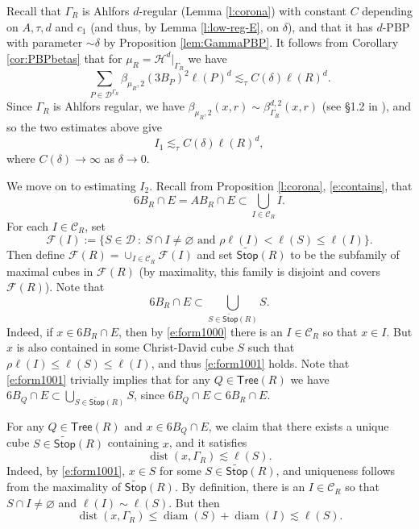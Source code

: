 \documentclass[11pt,reqno]{amsart}
\newcommand{\Stop}{\mathsf{Stop}}
\def\cC{{\mathscr{C}}}
\def\cF{{\mathscr{F}}}
\newcommand{\Tree}{\mathsf{Tree}}
\DeclareMathOperator{\diam}{diam}
\def\dist{\mathop\mathrm{dist}} 						%
\theoremstyle{definition}
\theoremstyle{remark}
\numberwithin{equation}{section}
\newcommand{\wt}{\widetilde}
\newcommand{\dD}{\mathcal{D}}
\theoremstyle{theorem}
\theoremstyle{definition}
\theoremstyle{remark}
\numberwithin{equation}{section}
\begin{document}
	Recall that $\Gamma_R$ is Ahlfors $d$-regular (Lemma \ref{l:corona}) with constant $C$ depending on $A, \tau, d$ and $c_1$ (and thus, by Lemma \ref{l:low-reg-E}, on $\delta$), and that it has $d$-PBP  with parameter $\sim\delta$ by Proposition \ref{lem:GammaPBP}. It follows from Corollary \ref{cor:PBPbetas} that for $\mu_R=\mathcal{H}^d|_{\Gamma_R}$ we have	
	\begin{equation*}
	\sum_{P \in \dD^{\Gamma_R}} \beta_{\mu_R,2}(3 B_P)^2 \ell(P)^d\lesssim_\tau C(\delta)\ell(R)^d.
	\end{equation*}
	Since $\Gamma_R$ is Ahlfors regular, we have $\beta_{\mu_R,2}(x,r)\sim \beta_{\Gamma_R}^{d,2}(x,r)$ (see \S 1.2 in \cite{azzam2018analyst}), and so the two estimates above give
	\begin{equation}
	I_1 \lesssim_\tau C(\delta) \ell(R)^d,
	\end{equation}
	where $C(\delta) \to \infty$ as $\delta\to 0$. 
	\newcommand{\wstop}{\wt{\Stop}}
	
	We move on to estimating $I_2$. Recall from Proposition \ref{l:corona}, \eqref{e:contains}, that
	\begin{equation}\label{e:form1000}
		 6 B_R \cap E = A B_R \cap E \subset \bigcup_{I\in\cC_R} I.
	\end{equation} 
	For each $I \in \cC_R$, set 
	\begin{equation}\label{e:form1002}
		\cF(I):= \{S \in \dD \ :\ S \cap I\neq \varnothing \mbox{ and } \rho \ell(I) < \ell(S) \leq \ell(I)\}.
	\end{equation}
	Then define $\cF(R)= \cup_{I \in \cC_R} \cF(I)$ and set $\wstop(R)$ to be the subfamily of maximal cubes in $\cF(R)$ (by maximality, this family is disjoint and covers $\cF(R)$).
	Note that
	\begin{equation}\label{e:form1001}
		6B_R \cap E \subset \bigcup_{S \in \wstop(R)} S. 
	\end{equation}
	Indeed, if $x \in 6B_R \cap E$, then by \eqref{e:form1000} there is an $I \in \cC_R$ so that $x \in I$. But $x$ is also contained in some Christ-David cube $S$ such that $\rho\ell(I) \leq \ell(S) \leq \ell(I)$, and thus \eqref{e:form1001} holds. Note that \eqref{e:form1001} trivially implies that for any $Q\in\Tree(R)$ we have $6B_Q \cap E \subset \bigcup_{S \in \wstop(R)} S$, since $6B_Q \cap E \subset 6B_R\cap E$.
	
	For any $Q\in\Tree(R)$ and $x \in 6B_Q \cap E$, we claim that there exists a unique cube $S \in \wstop(R)$ containing $x$, and it satisfies
	\begin{equation}\label{eq:blaaaa}
		\dist(x, \Gamma_R) \lesssim \ell(S).
	\end{equation}
	Indeed, by \eqref{e:form1001}, $x \in S$ for some $S \in \wstop(R)$, and uniqueness follows from the maximality of $\wstop(R)$. By definition, there is an $I \in \cC_R$ so that $S \cap I \neq \varnothing$ and $\ell(I)\sim \ell(S)$. But then
	\begin{equation*}
		\dist(x, \Gamma_R) \leq \diam(S) + \diam(I) \lesssim \ell(S).
	\end{equation*}
	
\end{document}
